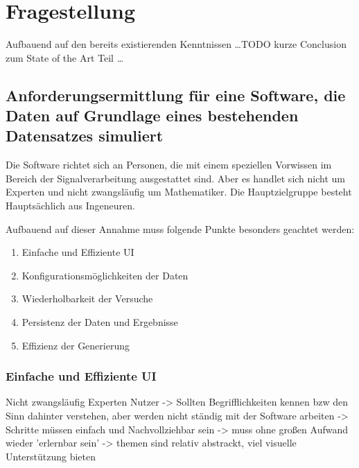 \chapter{Fragestellung}

Aufbauend auf den bereits existierenden Kenntnissen \dots TODO kurze Conclusion zum State of the Art Teil \dots




\section{Anforderungsermittlung für eine Software, die Daten auf Grundlage eines bestehenden Datensatzes simuliert}

Die Software richtet sich an Personen, die mit einem speziellen Vorwissen im Bereich der Signalverarbeitung ausgestattet sind.
Aber es handlet sich nicht um Experten und nicht zwangsläufig um Mathematiker. Die Hauptzielgruppe besteht Hauptsächlich aus Ingeneuren.

Aufbauend auf dieser Annahme muss folgende Punkte besonders geachtet werden:

\begin{enumerate}
    \item Einfache und Effiziente UI 
    \item Konfigurationsmöglichkeiten der Daten 
    \item Wiederholbarkeit der Versuche
    \item Persistenz der Daten und Ergebnisse
    \item Effizienz der Generierung
\end{enumerate}



\subsection{Einfache und Effiziente UI}

Nicht zwangsläufig Experten Nutzer -> Sollten Begrifflichkeiten kennen bzw den Sinn dahinter verstehen, aber werden nicht ständig mit der Software arbeiten 
-> Schritte müssen einfach und Nachvollziehbar sein
-> muss ohne großen Aufwand wieder 'erlernbar sein'
-> themen sind relativ abstrackt, viel visuelle Unterstützung bieten

